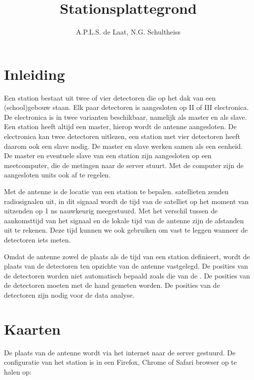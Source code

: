 

\title{Stationsplattegrond}
\author{A.P.L.S. de Laat, N.G. Schultheiss}



\maketitle

\section{Inleiding}

Een \hisparc station bestaat uit twee of vier detectoren die op het dak van een
(school)gebouw staan. Elk paar detectoren is aangesloten op \hisparc II of
\hisparc III electronica. De \hisparc electronica is in twee varianten
beschikbaar, namelijk als master en als slave. Een \hisparc station heeft
altijd een \hisparc master, hierop wordt de \gps antenne aangesloten. De
electronica kan twee detectoren uitlezen, een station met vier detectoren heeft
daarom ook een slave nodig. De master en slave werken samen als een eenheid. De
master en eventuele slave van een station zijn aangesloten op een meetcomputer,
die de metingen naar de \hisparc server stuurt. Met de computer zijn de
aangesloten units ook af te regelen.

Met de \gps antenne is de locatie van een station te bepalen.
\gps satellieten zenden radiosignalen uit, in dit signaal wordt de tijd
van de satelliet op het moment van uitzenden op 1 ns nauwkeurig meegestuurd.
Met het verschil tussen de aankomsttijd van het signaal en de lokale
tijd van de antenne zijn de afstanden uit te rekenen. Deze tijd kunnen we
ook gebruiken om  vast te leggen wanneer de detectoren iets meten.

Omdat de \gps antenne zowel de plaats als de tijd van een station definieert,
wordt de plaats van de detectoren ten opzichte van de \gps antenne vastgelegd.
De posities van de detectoren worden niet automatisch bepaald zoals die van de
\gps. De posities van de detectoren moeten met de hand gemeten worden. De
posities van de detectoren zijn nodig voor de data analyse.


\section{Kaarten}

De plaats van de \gps antenne wordt via het internet naar de \hisparc
server gestuurd. De configuratie van het station is in een Firefox,
Chrome of Safari browser op te halen op:

